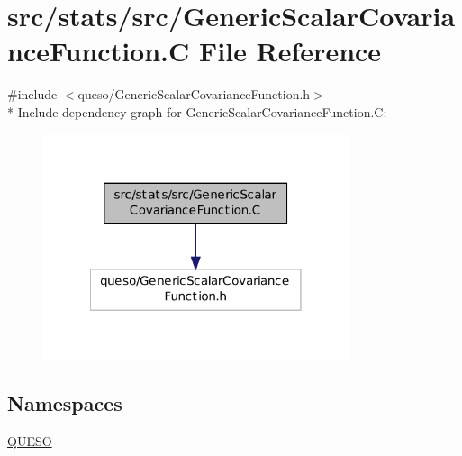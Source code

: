 \hypertarget{_generic_scalar_covariance_function_8_c}{\section{src/stats/src/\-Generic\-Scalar\-Covariance\-Function.C File Reference}
\label{_generic_scalar_covariance_function_8_c}
}
{\ttfamily \#include $<$queso/\-Generic\-Scalar\-Covariance\-Function.\-h$>$}\\*
Include dependency graph for Generic\-Scalar\-Covariance\-Function.\-C\-:
\nopagebreak
\begin{figure}[H]
\begin{center}
\leavevmode
\includegraphics[width=254pt]{_generic_scalar_covariance_function_8_c__incl}
\end{center}
\end{figure}
\subsection*{Namespaces}
\begin{DoxyCompactItemize}
\item 
\hyperlink{namespace_q_u_e_s_o}{Q\-U\-E\-S\-O}
\end{DoxyCompactItemize}
